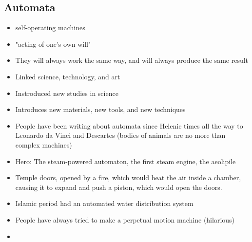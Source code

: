 \documentclass{article}
\begin{document}
\subsection{Automata}
\begin{itemize}
  \item self-operating machines
  \item "acting of one's own will"
  \item They will always work the same way, and will always produce the same result
  \item Linked science, technology, and art
  \item Instroduced new studies in science
  \item Introduces new materials, new tools, and new techniques
  \item People have been writing about automata since Helenic times all the way to Leonardo da Vinci
    and Descartes (bodies of animals are no more than complex machines)
  \item Hero: The steam-powered automaton, the first steam engine, the aeolipile
  \item Temple doors, opened by a fire, which would heat the air inside a chamber,
    causing it to expand and push a piston, which would open the doors.
  \item Islamic period had an automated water distribution system
  \item People have always tried to make a perpetual motion machine (hilarious)
  \item
\end{itemize}
\end{document}
